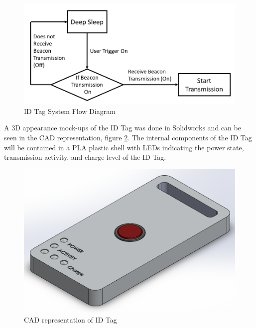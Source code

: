 \medskip
\begin{figure}[H]
\centering
    \includegraphics[scale=0.50]{./images/id_flow.png}
    \caption{ID Tag System Flow Diagram}
    \label{id_flow}
\end{figure}
\medskip

A 3D appearance mock-ups of the ID Tag was done in Solidworks and can be seen in the CAD representation, figure \ref{ID_Tag}. The internal components of the ID Tag will be contained in a PLA plastic shell with LEDs indicating the power state, transmission activity, and charge level of the ID Tag. 

\medskip
\begin{figure}[H]
\centering
    \includegraphics[scale=0.40]{./images/ID_Tag.png}
    \caption{CAD representation of ID Tag}
    \label{ID_Tag}
\end{figure}



\pagebreak
